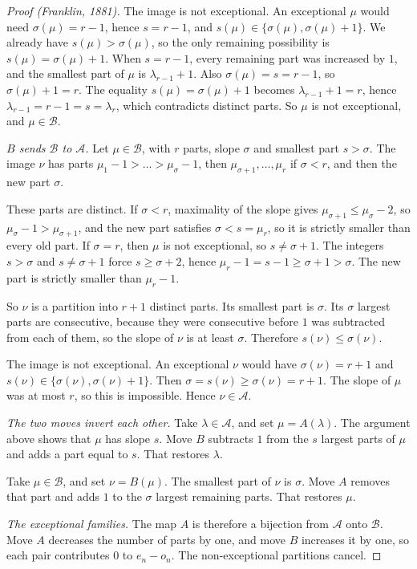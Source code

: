 \begin{proof}[Proof (Franklin, 1881)]
The image is not exceptional. An exceptional $\mu$ would need $\sigma(\mu)=r-1$, hence $s=r-1$, and $s(\mu)\in\{\sigma(\mu),\sigma(\mu)+1\}$. We already have $s(\mu)>\sigma(\mu)$, so the only remaining possibility is $s(\mu)=\sigma(\mu)+1$. When $s=r-1$, every remaining part was increased by $1$, and the smallest part of $\mu$ is $\lambda_{r-1}+1$. Also $\sigma(\mu)=s=r-1$, so $\sigma(\mu)+1=r$. The equality $s(\mu)=\sigma(\mu)+1$ becomes $\lambda_{r-1}+1=r$, hence $\lambda_{r-1}=r-1=s=\lambda_r$, which contradicts distinct parts. So $\mu$ is not exceptional, and $\mu\in\mathcal B$.

\emph{$B$ sends $\mathcal B$ to $\mathcal A$.}
Let $\mu\in\mathcal B$, with $r$ parts, slope $\sigma$ and smallest part $s>\sigma$. The image $\nu$ has parts $\mu_1-1>\dots>\mu_\sigma-1$, then $\mu_{\sigma+1},\dots,\mu_r$ if $\sigma<r$, and then the new part $\sigma$.

These parts are distinct. If $\sigma<r$, maximality of the slope gives $\mu_{\sigma+1}\le\mu_\sigma-2$, so $\mu_\sigma-1>\mu_{\sigma+1}$, and the new part satisfies $\sigma<s=\mu_r$, so it is strictly smaller than every old part. If $\sigma=r$, then $\mu$ is not exceptional, so $s\ne\sigma+1$. The integers $s>\sigma$ and $s\ne\sigma+1$ force $s\ge\sigma+2$, hence $\mu_r-1=s-1\ge\sigma+1>\sigma$. The new part is strictly smaller than $\mu_r-1$.

So $\nu$ is a partition into $r+1$ distinct parts. Its smallest part is $\sigma$. Its $\sigma$ largest parts are consecutive, because they were consecutive before $1$ was subtracted from each of them, so the slope of $\nu$ is at least $\sigma$. Therefore $s(\nu)\le\sigma(\nu)$.

The image is not exceptional. An exceptional $\nu$ would have $\sigma(\nu)=r+1$ and $s(\nu)\in\{\sigma(\nu),\sigma(\nu)+1\}$. Then $\sigma=s(\nu)\ge\sigma(\nu)=r+1$. The slope of $\mu$ was at most $r$, so this is impossible. Hence $\nu\in\mathcal A$.

\emph{The two moves invert each other.}
Take $\lambda\in\mathcal A$, and set $\mu=A(\lambda)$. The argument above shows that $\mu$ has slope $s$. Move $B$ subtracts $1$ from the $s$ largest parts of $\mu$ and adds a part equal to $s$. That restores $\lambda$.

Take $\mu\in\mathcal B$, and set $\nu=B(\mu)$. The smallest part of $\nu$ is $\sigma$. Move $A$ removes that part and adds $1$ to the $\sigma$ largest remaining parts. That restores $\mu$.

\emph{The exceptional families.}
The map $A$ is therefore a bijection from $\mathcal A$ onto $\mathcal B$. Move $A$ decreases the number of parts by one, and move $B$ increases it by one, so each pair contributes $0$ to $e_n-o_n$. The non-exceptional partitions cancel.


\end{proof}
